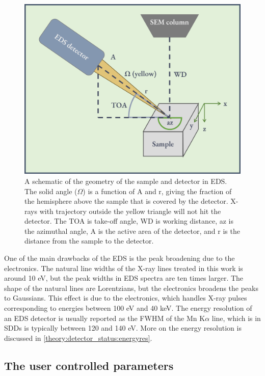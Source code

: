 \begin{figure}[ht]
    \centering
    \includegraphics[width=0.6\linewidth]{figures/EDS_geometry.png}
    \caption{
        A schematic of the geometry of the sample and detector in EDS.
        The solid angle ($\Omega$) is a function of A and r, giving the fraction of the hemisphere above the sample that is covered by the detector.
        X-rays with trajectory outside the yellow triangle will not hit the detector.
        The TOA is take-off angle, WD is working distance, az is the azimuthal angle, A is the active area of the detector, and r is the distance from the sample to the detector.
    }
    \label{fig:eds_geometry}
\end{figure}






One of the main drawbacks of the EDS is the peak broadening due to the electronics.
The natural line widths of the X-ray lines treated in this work is around 10 eV, but the peak widths in EDS spectra are ten times larger.
The shape of the natural lines are Lorentzians, but the electronics broadens the peaks to Gaussians.
This effect is due to the electronics, which handles X-ray pulses corresponding to energies between 100 eV and 40 keV.
The energy resolution of an EDS detector is usually reported as the FWHM of the Mn K$\alpha$ line, which is in SDDs is typically between 120 and 140 eV.
More on the energy resolution is discussed in \cref{theory:detector_status:energyres}.










\clearpage



\subsection{The user controlled parameters}
\label{theory:eds:user_controlled_parameters}

